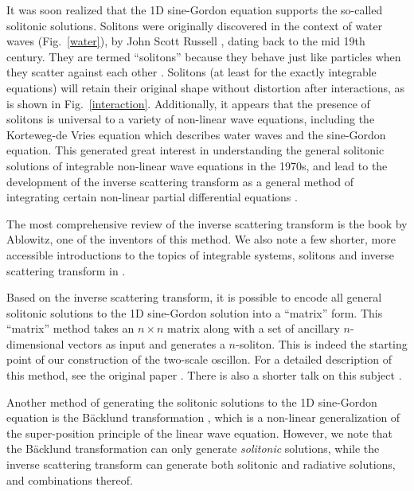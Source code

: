 \documentclass{report}
\begin{document}
It was soon realized that the 1D sine-Gordon equation supports the so-called solitonic solutions. Solitons were originally discovered in the context of water waves (Fig.~\ref{water}), by John Scott Russell \cite{russell}, dating back to the mid 19th century. They are termed ``solitons'' because they behave just like particles when they scatter against each other \cite{Perring:1962vs}. Solitons (at least for the exactly integrable equations) will retain their original shape without distortion after interactions, as is shown in Fig.~\ref{interaction}. Additionally, it appears that the presence of solitons is universal to a variety of non-linear wave equations, including the Korteweg-de Vries equation which describes water waves \cite{ablowitz} and the sine-Gordon equation. This generated great interest in understanding the general solitonic solutions of integrable non-linear wave equations in the 1970s, and lead to the development of the inverse scattering transform as a general method of integrating certain non-linear partial differential equations \cite{SAPM:SAPM1974534249}.

The most comprehensive review of the inverse scattering transform is the book \cite{ablowitz} by Ablowitz, one of the inventors of this method. We also note a few shorter, more accessible introductions to the topics of integrable systems, solitons and inverse scattering transform in \cite{Aktosun2009, spiro, intsys}.

Based on the inverse scattering transform, it is possible to encode all general solitonic solutions to the 1D sine-Gordon solution into a ``matrix'' form. This ``matrix'' method takes an $n\times n$ matrix along with a set of ancillary $n$-dimensional vectors as input and generates a $n$-soliton. This is indeed the starting point of our construction of the two-scale oscillon. For a detailed description of this method, see the original paper \cite{:/content/aip/journal/jmp/51/12/10.1063/1.3520596}. There is also a shorter talk on this subject \cite{sgtalk}.

Another method of generating the solitonic solutions to the 1D sine-Gordon equation is the B\"acklund transformation \cite{Dodd499, hietarinta1997introduction, Cuenda20111047}, which is a non-linear generalization of the super-position principle of the linear wave equation. However, we note that the B\"acklund transformation can only generate \emph{solitonic} solutions, while the inverse scattering transform can generate both solitonic and radiative solutions, and combinations thereof.
\end{document}
